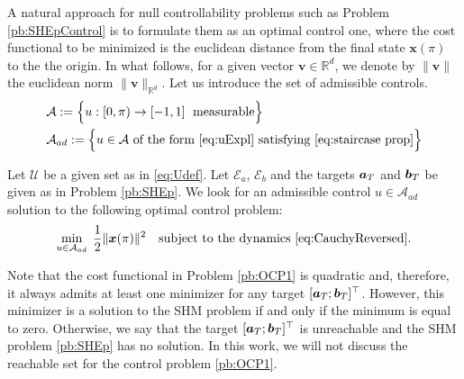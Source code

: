 \documentclass[9pt,shortpaper,twoside,web]{ieeecolor}
\begin{document}
A natural approach for null controllability problems such as Problem \ref{pb:SHEpControl} is to formulate them as an optimal control one, where the cost functional to be minimized is the euclidean distance from the final state $\bm{x}(\pi)$ to the the origin. In what follows, for a given vector $\bm{v}\in\mathbb{R}^d$, we  denote by $\|\bm{v}\|$ the euclidean norm $\|\bm{v}\|_{\mathbb{R}^d}$.  
Let us introduce the set of admissible controls.
\begin{align*}
	&\mathcal A:= \Big\{u:[0,\pi)\to [-1,1]\; \text{ measurable}\Big\}
	\\
	&\mathcal A_{ad}:= \Big\{u\in\mathcal A \text{ of the form } \eqref{eq:uExpl} \text{ satisfying } \eqref{eq:staircase prop}\Big\}
\end{align*}

\begin{problem}\label{pb:OCP1}
	Let $\mathcal{U}$ be a given set as in \eqref{eq:Udef}. Let $\mathcal{E}_a$, $\mathcal{E}_b$ and the targets $\bm{a}_T$ and $\bm{b}_T$ be given as in Problem \ref{pb:SHEp}. We look for an admissible control $u\in \mathcal{A}_{ad}$ solution to the following optimal control problem:
	\begin{equation*}
		\min_{u \in \mathcal{A}_{ad}}\;\frac 12 \|\bm{x}(\pi)\|^2 \quad \text{subject to the dynamics \eqref{eq:CauchyReversed}}.
	\end{equation*}
\end{problem} 

\begin{remark}
	Note that the cost functional in Problem \ref{pb:OCP1} is quadratic and, therefore, it always admits at least one minimizer for any target $[\bm{a}_T;\bm{b}_T]^\top$. However, this minimizer is a solution to the SHM problem if and only if the minimum is equal to zero. Otherwise, we say that the target $[\bm{a}_T;\bm{b}_T]^\top$ is unreachable and the SHM problem \ref{pb:SHEp} has no solution.  In this work, we will not discuss the reachable set for the control problem \eqref{pb:OCP1}.
\end{remark}
\end{document}
